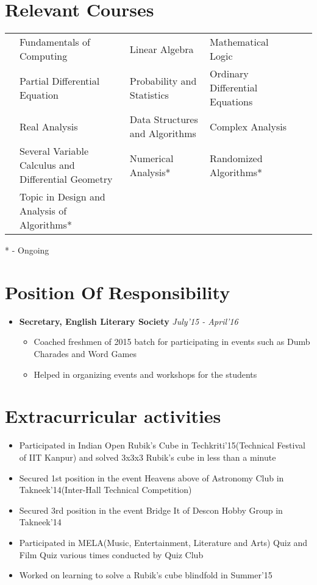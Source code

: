 \documentclass[11pt,a4paper]{article}
\begin{document}
\section*{Relevant Courses}
\vspace{-0.3cm}
\begin{tabular}{L{0.05cm} L{5.8cm} L{6.5cm} L{7.5cm} L{8cm} L{13cm}}
& Fundamentals of Computing  & Linear Algebra & Mathematical Logic \vspace{0.1cm}\\

& Partial Differential Equation & Probability and Statistics & Ordinary Differential Equations \vspace{0.1cm}\\
& Real Analysis & Data Structures and Algorithms & Complex Analysis \vspace{0.1cm}\\ 
& Several Variable Calculus and Differential Geometry & Numerical Analysis* & Randomized Algorithms* \vspace{0.1cm}\\
& Topic in Design and Analysis of Algorithms*
\end{tabular}
\hspace*{10cm} \hfill{* - Ongoing}
\vspace{-0.5cm}

\section*{Position Of Responsibility}
\vspace{-0.1cm}
\begin{itemize}
\item \textbf{Secretary, English Literary Society}   \hfill\textit{ July'15 - April'16}
\begin{itemize}
\item Coached freshmen of 2015 batch for participating in events such as Dumb Charades and Word Games
\item Helped in organizing events and workshops for the students
\end{itemize}
\end{itemize}

\vspace{-0.4cm}
\section*{Extracurricular activities}
\begin{itemize}
\item Participated in Indian Open Rubik’s Cube in Techkriti'15(Technical Festival of IIT Kanpur) and solved 3x3x3
Rubik’s cube in less than a minute
\item Secured 1st position in the event Heavens above of Astronomy Club in Takneek'14(Inter-Hall Technical
Competition)
\item Secured 3rd position in the event Bridge It of Descon Hobby Group in Takneek'14
\item Participated in MELA(Music, Entertainment, Literature and Arts) Quiz and Film Quiz various times conducted
by Quiz Club
\item Worked on learning to solve a Rubik’s cube blindfold in Summer'15
\end{itemize}
\end{document}
